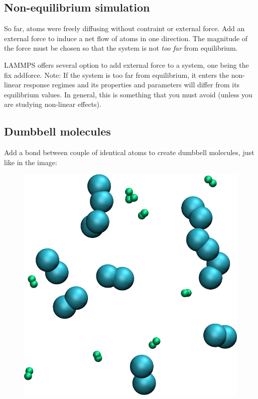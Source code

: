 \noindent \subsection{Non-equilibrium simulation}

So far, atoms were freely diffusing without contraint or external force.
Add an external force to induce a net flow of atoms in one
direction. The magnitude of the force must be chosen so
that the system is not \textit{too far} from equilibrium.

\begin{tcolorbox}[colback=mylightblue!5!white,colframe=mylightblue!75!black,title=Hints]
LAMMPS offers several option to add external force to a system, one 
being the fix addforce.
Note: If the system is too far from equilibrium, it enters the non-linear response 
regimes and its properties and parameters will differ from its equilibrium values.
In general, this is something that you must avoid (unless you are studying
non-linear effects). 
\end{tcolorbox}

\noindent \subsection{Dumbbell molecules}

Add a bond between couple of identical atoms to create
dumbbell molecules, just like in the image:

\begin{figure}
\includegraphics[width=\linewidth]{tutorials/level0/lennard-jones-fluid/dumbell-light.png}
\end{figure}

